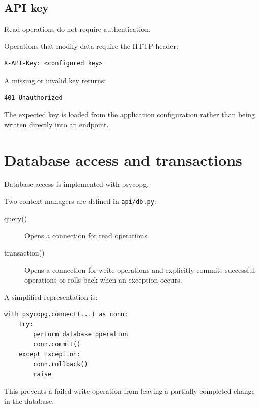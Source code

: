 \documentclass[11pt,a4paper]{article}
\begin{document}
\subsection{API key}

Read operations do not require authentication.

Operations that modify data require the HTTP header:

\begin{verbatim}
X-API-Key: <configured key>
\end{verbatim}

A missing or invalid key returns:

\begin{verbatim}
401 Unauthorized
\end{verbatim}

The expected key is loaded from the application configuration rather than
being written directly into an endpoint.

\section{Database access and transactions}

Database access is implemented with psycopg.

Two context managers are defined in \texttt{api/db.py}:

\begin{description}

    \item[query()]
    Opens a connection for read operations.

    \item[transaction()]
    Opens a connection for write operations and explicitly commits successful
    operations or rolls back when an exception occurs.

\end{description}

A simplified representation is:

\begin{verbatim}
with psycopg.connect(...) as conn:
    try:
        perform database operation
        conn.commit()
    except Exception:
        conn.rollback()
        raise
\end{verbatim}

This prevents a failed write operation from leaving a partially completed
change in the database.
\end{document}
